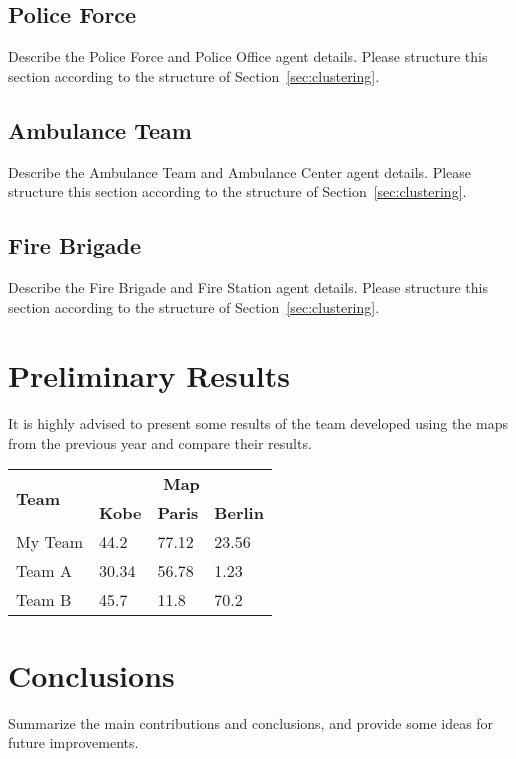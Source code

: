 \documentclass[runningheads,a4paper]{llncs}
\begin{document}
\subsection{Police Force}
\label{sec:policeForce}
Describe the Police Force and Police Office agent details. Please structure this section according to the structure of Section~\ref{sec:clustering}.
\subsection{Ambulance Team}
\label{sec:ambulanceTeam}
Describe the Ambulance Team and Ambulance Center agent details. Please structure this section according to the structure of Section~\ref{sec:clustering}.
\subsection{Fire Brigade}
\label{sec:fireBrigade}
Describe the Fire Brigade and Fire Station agent details. Please structure this section according to the structure of Section~\ref{sec:clustering}.
\section{Preliminary Results}
\label{sec:results}
It is highly advised to present some results of the team developed using the maps from the previous year and compare their results.
\begin{table}
  \centering
  \begin{tabular}{llll}
    \hline
    \multirow{2}{*}{\textbf{Team}}  & \multicolumn{3}{c}{\textbf{Map}}\\
    \cline{2-4}
                                    & \textbf{Kobe} & \textbf{Paris}  & \textbf{Berlin}\\
    \hline
    My Team                         & 44.2          & 77.12           & 23.56\\
    Team A                          & 30.34         & 56.78           & 1.23\\
    Team B                          & 45.7          & 11.8            & 70.2\\
    \hline
  \end{tabular}
\end{table}
\section{Conclusions}
\label{sec:conclusions}
Summarize the main contributions and conclusions, and provide some ideas for
future improvements.


\end{document}
